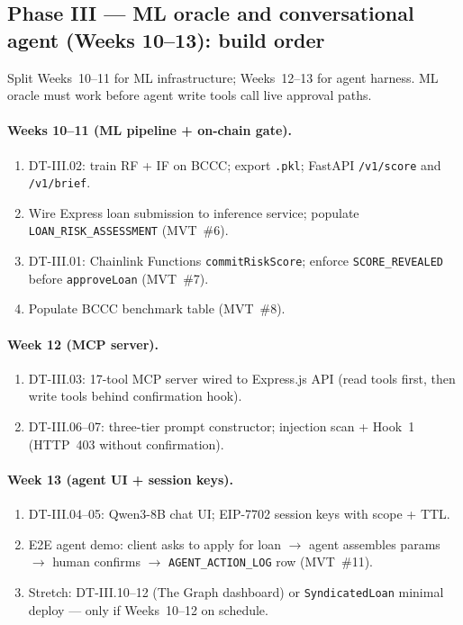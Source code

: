 \documentclass[12pt,a4paper]{report}
\begin{document}
\subsection{Phase III --- ML oracle and conversational agent (Weeks 10--13): build order}

Split Weeks~10--11 for ML infrastructure; Weeks~12--13 for agent harness. ML oracle must work before agent write tools call live approval paths.

\paragraph{Weeks 10--11 (ML pipeline + on-chain gate).}
\begin{enumerate}[noitemsep]
\item DT-III.02: train RF + IF on BCCC; export \texttt{.pkl}; FastAPI \texttt{/v1/score} and \texttt{/v1/brief}.
\item Wire Express loan submission to inference service; populate \texttt{LOAN\_RISK\_ASSESSMENT} (MVT~\#6).
\item DT-III.01: Chainlink Functions \texttt{commitRiskScore}; enforce \texttt{SCORE\_REVEALED} before \texttt{approveLoan} (MVT~\#7).
\item Populate BCCC benchmark table (MVT~\#8).
\end{enumerate}

\paragraph{Week 12 (MCP server).}
\begin{enumerate}[noitemsep]
\item DT-III.03: 17-tool MCP server wired to Express.js API (read tools first, then write tools behind confirmation hook).
\item DT-III.06--07: three-tier prompt constructor; injection scan + Hook~1 (HTTP~403 without confirmation).
\end{enumerate}

\paragraph{Week 13 (agent UI + session keys).}
\begin{enumerate}[noitemsep]
\item DT-III.04--05: Qwen3-8B chat UI; EIP-7702 session keys with scope + TTL.
\item E2E agent demo: client asks to apply for loan $\to$ agent assembles params $\to$ human confirms $\to$ \texttt{AGENT\_ACTION\_LOG} row (MVT~\#11).
\item Stretch: DT-III.10--12 (The Graph dashboard) or \texttt{SyndicatedLoan} minimal deploy --- only if Weeks~10--12 on schedule.
\end{enumerate}
\end{document}
